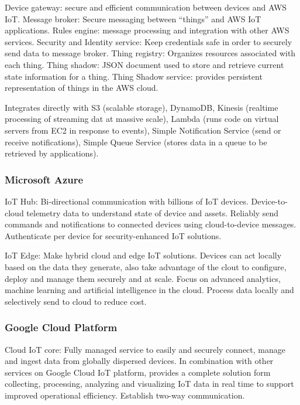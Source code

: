 Device gateway: secure and efficient communication between devices and AWS IoT.
Message broker: Secure messaging between \enquote{things} and AWS IoT applications.
Rules engine: message processing and integration with other AWS services. 
Security and Identity service: Keep credentials safe in order to securely send data to message broker. 
Thing registry: Organizes resources associated with each thing. 
Thing shadow: JSON document used to store and retrieve current state information for a thing.
Thing Shadow service: provides persistent representation of things in the AWS cloud. 

Integrates directly with S3 (scalable storage), DynamoDB, Kinesis (realtime processing of streaming dat at massive scale), Lambda (runs code on virtual servers from EC2 in response to events), Simple Notification Service (send or receive notifications), Simple Queue Service (stores data in a queue to be retrieved by applications). 

\subsubsection{Microsoft Azure}
IoT Hub: Bi-directional communication with billions of IoT devices. Device-to-cloud telemetry data to understand state of device and assets. Reliably send commands and notifications to connected devices using cloud-to-device messages. Authenticate per device for security-enhanced IoT solutions. 

IoT Edge: Make hybrid cloud and edge IoT solutions. Devices can act locally based on the data they generate, also take advantage of the clout to configure, deploy and manage them securely and at scale. Focus on advanced analytics, machine learning and artificial intelligence in the cloud. Process data locally and selectively send to cloud to reduce cost. 

\subsubsection{Google Cloud Platform}
Cloud IoT core: Fully managed service to easily and securely connect, manage and ingest data from globally dispersed devices. In combination with other services on Google Cloud IoT platform, provides a complete solution form collecting, processing, analyzing and visualizing IoT data in real time to support improved operational efficiency. Establish two-way communication.

